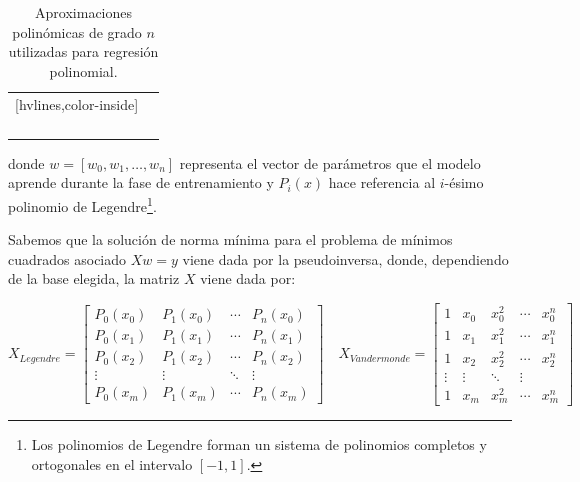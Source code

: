 \begin{table}[h]
    \centering
    \begin{NiceTabular}{c c}[hvlines,color-inside]
         &  \\ 
        
         &  \\ \\

         &   \\ \\

    \end{NiceTabular}
    \caption{Aproximaciones polinómicas de grado $n$ utilizadas para regresión polinomial.}\label{tabla:aproximaciones-polinomicas}
\end{table}

donde $w = [w_0, w_1, \ldots, w_n]$ representa el vector de parámetros que el modelo aprende durante la fase de entrenamiento y $P_i(x)$ hace referencia al $i$-ésimo polinomio de Legendre\footnote{Los polinomios de Legendre forman un sistema de polinomios completos y ortogonales en el intervalo $[-1, 1]$.}.\newline


Sabemos que la solución de norma mínima para el problema de mínimos cuadrados asociado $Xw=y$ viene dada por la pseudoinversa, donde, dependiendo de la base elegida, la matriz $X$ viene dada por:

\[
    X_{Legendre} = \begin{bmatrix}
        P_0(x_0) & P_1(x_0) & \cdots & P_n(x_0) \\
        P_0(x_1) & P_1(x_1) & \cdots & P_n(x_1) \\
        P_0(x_2) & P_1(x_2) & \cdots & P_n(x_2) \\
        \vdots & \vdots &    \ddots & \vdots \\
        P_0(x_m) & P_1(x_m) & \cdots & P_n(x_m)
        \end{bmatrix}
\quad
    X_{Vandermonde} = \begin{bmatrix}
    1 & x_0 & x_0^2 &\cdots & x_0^{n} \\
    1 & x_1 & x_1^2 &\cdots & x_1^{n} \\
    1 & x_2 & x_2^2 &\cdots & x_2^{n} \\
    \vdots & \vdots &    \ddots & \vdots \\
    1 & x_m & x_m^2 &\cdots & x_m^{n}
    \end{bmatrix}
\]

